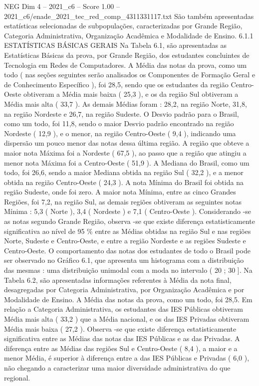 \begin{textsample}{NEG Dim 4 – 2021\_c6 – Score 1.00 – 2021\_c6/enade\_2021\_tec\_red\_comp\_4311331117.txt}
São também apresentadas estatísticas selecionadas de subpopulações, caracterizadas por Grande Região, Categoria Administrativa, Organização Acadêmica e Modalidade de Ensino. 6.1.1 ESTATÍSTICAS BÁSICAS GERAIS Na Tabela 6.1, são apresentadas as Estatísticas Básicas da prova, por Grande Região, dos estudantes concluintes de Tecnologia em Redes de Computadores.
A Média das notas da prova, como um todo ( nas seções seguintes serão analisados os Componentes de Formação Geral e de Conhecimento Específico ), foi 28,5, sendo que os estudantes da região Centro-Oeste obtiveram a Média mais baixa ( 25,3 ), e os da região Sul obtiveram a Média mais alta ( 33,7 ).
As demais Médias foram : 28,2, na região Norte, 31,8, na região Nordeste e 26,7, na região Sudeste.
O Desvio padrão para o Brasil, como um todo, foi 11,8, sendo o maior Desvio padrão encontrado na região Nordeste ( 12,9 ), e o menor, na região Centro-Oeste ( 9,4 ), indicando uma dispersão um pouco menor das notas dessa última região.
A região que obteve a maior nota Máxima foi a Nordeste ( 67,5 ), ao passo que a região que atingiu a menor nota Máxima foi a Centro-Oeste ( 51,9 ).
A Mediana do Brasil, como um todo, foi 26,6, sendo a maior Mediana obtida na região Sul ( 32,2 ), e a menor obtida na região Centro-Oeste ( 24,3 ).
A nota Mínima do Brasil foi obtida na região Sudeste, onde foi zero.
A maior nota Mínima, entre as cinco Grandes Regiões, foi 7,2, na região Sul, as demais regiões obtiveram as seguintes notas Mínima : 5,3 ( Norte ), 3,4 ( Nordeste ) e 7,1 ( Centro-Oeste ).
Considerando -se as notas segundo Grande Região, observa -se que existe diferença estatisticamente significativa ao nível de 95 \% entre as Médias obtidas na região Sul e nas regiões Norte, Sudeste e Centro-Oeste, e entre a região Nordeste e as regiões Sudeste e Centro-Oeste.
O comportamento das notas dos estudantes de todo o Brasil pode ser observado no Gráfico 6.1, que apresenta um histograma com a distribuição das mesmas : uma distribuição unimodal com a moda no intervalo ( 20 ; 30 ].
Na Tabela 6.2, são apresentadas informações referentes à Média da nota final, desagregadas por Categoria Administrativa, por Organização Acadêmica e por Modalidade de Ensino.
A Média das notas da prova, como um todo, foi 28,5.
Em relação a Categoria Administrativa, os estudantes das IES Públicas obtiveram Média mais alta ( 33,2 ) que a Média nacional, e os das IES Privadas obtiveram Média mais baixa ( 27,2 ).
Observa -se que existe diferença estatisticamente significativa entre as Médias das notas das IES Públicas e as das Privadas.
A diferença entre as Médias das regiões Sul e Centro-Oeste ( 8,4 ), a maior e a menor Média, é superior à diferença entre a das IES Públicas e Privadas ( 6,0 ), não chegando a caracterizar uma maior diversidade administrativa do que regional.

\end{textsample}
